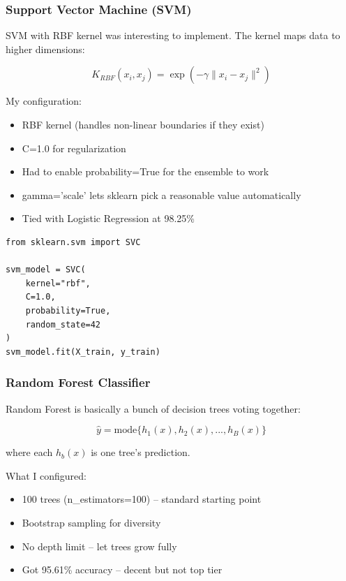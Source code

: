 \documentclass[12pt]{article}
\begin{document}
\subsubsection{Support Vector Machine (SVM)}
SVM with RBF kernel was interesting to implement. The kernel maps data to higher dimensions:

\begin{equation}
K_{RBF}(x_i, x_j) = \exp\left(-\gamma \|x_i - x_j\|^2\right)
\end{equation}

My configuration:
\begin{itemize}
    \item RBF kernel (handles non-linear boundaries if they exist)
    \item C=1.0 for regularization
    \item Had to enable probability=True for the ensemble to work
    \item gamma='scale' lets sklearn pick a reasonable value automatically
    \item Tied with Logistic Regression at 98.25\%
\end{itemize}

\begin{lstlisting}[style=pythonstyle, caption={SVM Implementation}]
from sklearn.svm import SVC

svm_model = SVC(
    kernel="rbf",
    C=1.0,
    probability=True,
    random_state=42
)
svm_model.fit(X_train, y_train)
\end{lstlisting}

\subsubsection{Random Forest Classifier}
Random Forest is basically a bunch of decision trees voting together:

\begin{equation}
\hat{y} = \text{mode}\{h_1(x), h_2(x), ..., h_B(x)\}
\end{equation}

where each $h_b(x)$ is one tree's prediction.

What I configured:
\begin{itemize}
    \item 100 trees (n\_estimators=100) -- standard starting point
    \item Bootstrap sampling for diversity
    \item No depth limit -- let trees grow fully
    \item Got 95.61\% accuracy -- decent but not top tier
\end{itemize}
\end{document}

